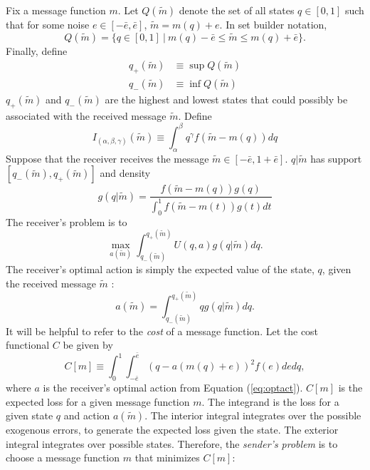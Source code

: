 \documentclass{article}
\begin{document}
Fix a message function $m$. Let $Q(\widetilde{m})$ denote the set of all states $q\in [ 0,1]$ such that for some noise $e\in [ -\bar{e},\bar{e}]$, $\widetilde{m}=m(q)+e$. In set builder notation,
\begin{equation}
	Q(\widetilde{m})=\{q\in[0,1]\:|\:m(q)-\bar{e}\leq \widetilde{m}\leq m(q)+\bar{e}\}.
\end{equation}
Finally, define
\begin{align}
	q_{+}(\widetilde{m})&\equiv \sup Q(\widetilde{m})\\
	q_{-}(\widetilde{m})&\equiv \inf Q(\widetilde{m})
\end{align}
$q_{+}(\widetilde{m})$ and $ q_{-}(\widetilde{m})$ are the highest and lowest states that could possibly be associated with the received message $\widetilde{m}$. Define
\begin{equation}
	I_{(\alpha,\beta,\gamma)}(\widetilde{m})\equiv\int_{\alpha}^{\beta}{q^{\gamma}f(\tilde{m}-m(q))dq}
\end{equation}
Suppose that the receiver receives the message $\widetilde{m}\in [ - \bar{e},1+\bar{e}]$. $q|\widetilde{m}$ has support $[q_{-}( \widetilde{m}),q_{+}(\widetilde{m})]$ and density
\begin{equation}\label{eq:posterior} 
	g(q|\widetilde{m})=\frac{f(\widetilde{m}-m(q))g(q)}{\int_{0}^{1}{ f(\widetilde{m}-m(t))g(t)dt}}  
\end{equation} 
The receiver's problem is to 
\begin{equation} 
	\max_{a(\widetilde{m})}\int_{q_{-}(\widetilde{m})}^{q_{+}(\widetilde{m})}{U(q,a)g(q|\widetilde{m})}dq.  
\end{equation} 
The receiver's optimal action is simply the expected value of the state, $q$, given the received message $\widetilde{m}$ : 
\begin{equation} 
	a(\widetilde{m})=\int_{q_{-}(\widetilde{m})}^{q_{+}(\widetilde{m})}{qg(q| \widetilde{m})}dq.  \label{eq:optact} 
\end{equation}
It will be helpful to refer to the \textit{cost }of a message function. Let the cost functional $C$ be given by 
\begin{equation}
	C[m]\equiv \int_{0}^{1}{\int_{-\bar{e}}^{\bar{e}}{(q-a(m(q)+e))^{2}f(e)de}dq},  
\end{equation}
where $a$ is the receiver's optimal action from Equation (\ref{eq:optact}). $C[m]$ is the expected loss for a given message function $m$. The integrand is the loss for a given state $q$ and action $a(\widetilde{m})$. The interior integral integrates over the possible exogenous errors, to generate the expected loss given the state. The exterior integral integrates over possible states. Therefore, the \textit{sender's problem} is to choose a message function $m$ that minimizes $C[m]$: 
\end{document}
